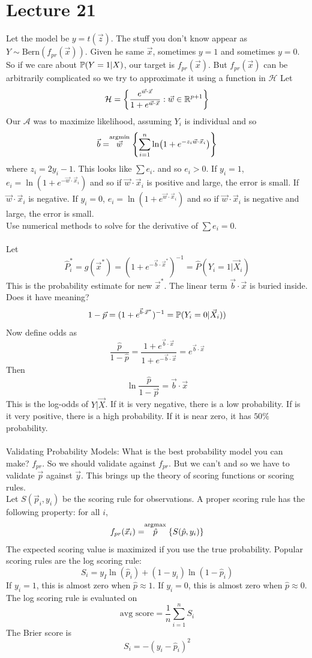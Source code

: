 \documentclass[12pt]{article}
\begin{document}
\section{Lecture 21} 
Let the model be $y = t(\vec{z})$. The stuff you don't know appear as $Y \sim \text{Bern}(f_{pr}(\vec{x}))$. Given he same $\vec{x}$, sometimes $y=1$ and sometimes $y = 0$. So if we care about $\mathbb{P}(Y = 1| X)$, our target is $f_{pr}(\vec{x})$. But $f_{pr}(\vec{x})$ can be arbitrarily complicated so we try to approximate it using a function in $\mathcal{H}$ Let $$\mathcal{H} = \left\{  \frac{e^{\vec{w} \cdot \vec{x}}}{1 + e^{\vec{w} \cdot \vec{x}}}: \vec{w} \in \mathbb{R}^{p+1} \right\} $$ Our $\mathcal{A}$ was to maximize likelihood, assuming $Y_i$ is individual and so $$ \vec{b} = \stackrel{\text{argmin}}{\vec{w}} \left\{ \sum_{i=1}^n \ln (1 + e^{-z_i\vec{w} \cdot \vec{x}_i}) \right\} $$ where $z_i = 2y_i - 1$. This looks like $\sum e_i$. and so $e_i > 0$. If $y_i = 1$, $e_i = \ln(1 + e^{-\vec{w} \cdot \vec{x}_i})$ and so if $\vec{w} \cdot \vec{x}_i$ is positive and large, the error is small. If $\vec{w} \cdot \vec{x}_i$ is negative. If $y_i = 0$, $e_i = \ln(1 + e^{\vec{w} \cdot \vec{x}_i})$ and so if $\vec{w} \cdot \vec{x}_i$ is negative and large, the error is small. \\ Use numerical methods to solve for the derivative of $\sum e_i = 0$. \\~\\
Let $$ \hat{P}_i^* = g(\vec{x}^*) = (1 + e^{-\vec{b} \cdot \vec{x}^*})^{-1} = \hat{P}(Y_i = 1 | \vec{X}_i) $$ This is the probability estimate for new $\vec{x}^*$. The linear term $\vec{b} \cdot \vec{x}$ is buried inside. Does it have meaning? $$ 1 - \vec{p} = (1 + e^{\vec{b} \cdot \vec{x}^*})^{-1} = \mathbb{P}(Y_i = 0 | \vec{X}_i))$$ Now define odds as $$ \frac{\hat{p}}{1 - \hat{p}} = \frac{1 + e^{\vec{b} \cdot \vec{x}}}{1 + e^{-\vec{b} \cdot \vec{x}}} = e^{\vec{b} \cdot \vec{x}} $$ Then $$ \ln \frac{\hat{p}}{1-\vec{p}} = \vec{b} \cdot \vec{x} $$ This is the log-odds of $Y | \vec{X}$. If it is very negative, there is a low probability. If is it very positive, there is a high probability. If it is near zero, it has $50\%$ probability. \\~\\
Validating Probability Models: What is the best probability model you can make? $f_{pr}$. So we should validate against $f_{pr}$. But we can't and so we have to validate $\vec{p}$ against $\vec{y}$. This brings up the theory of scoring functions or scoring rules. \\ Let $S(\vec{p}_i, y_i)$ be the scoring rule for observations. A proper scoring rule has the following property: for all $i$, $$f_{pr}(\vec{x}_i) = \stackrel{\text{argmax}}{\hat{p}} \left\{ S(\hat{p}, y_i) \right\} $$ The expected scoring value is maximized if you use the true probability. Popular scoring rules are the log scoring rule: $$ S_i = y_I\ln(\hat{p}_i) + (1-y_i)\ln(1-\hat{p}_i) $$ If $y_i = 1$, this is almost zero when $\hat{p} \approx 1$. If $y_i = 0$, this is almost zero when $\hat{p} \approx 0$. The log scoring rule is evaluated on $$ \text{avg score} = \frac{1}{n} \sum_{i=1}^n S_i$$ The Brier score is $$S_i = -(y_i - \hat{p}_i)^2 $$ 
\end{document}
